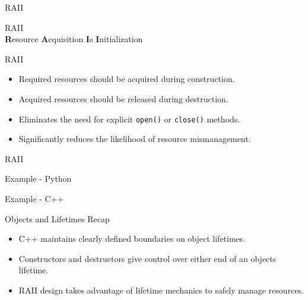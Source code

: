 \documentclass{beamer}
\begin{document}
	\begin{frame}{RAII}
		\begin{center}
			\huge RAII\\
			\bigskip
			\normalsize\textbf{R}esource \textbf{A}cquisition \textbf{I}s \textbf{I}nitialization
		\end{center}
	\end{frame}
	
	\begin{frame}{RAII}
		\begin{itemize}
			\item Required resources should be acquired during construction.
			\medskip
			\item Acquired resources should be released during destruction.
			\medskip
			\item Eliminates the need for explicit \texttt{open()} or \texttt{close()} methods.
			\medskip
			\item Significantly reduces the likelihood of resource mismanagement.
		\end{itemize}
	\end{frame}
	
	
	
	\begin{frame}{RAII}
		\begin{exampleblock}{Example - Python}
			\lstI
		\end{exampleblock}
		\begin{exampleblock}{Example - C++}
			\lstII
		\end{exampleblock}
	\end{frame}
	
	\begin{frame}{Objects and Lifetimes Recap}
		\begin{itemize}
			\item C++ maintains clearly defined boundaries on object lifetimes.
			\medskip
			\item Constructors and destructors give control over either end of an objects lifetime.
			\medskip
			\item RAII design takes advantage of lifetime mechanics to safely manage resources.
		\end{itemize}
	\end{frame}
\end{document}
